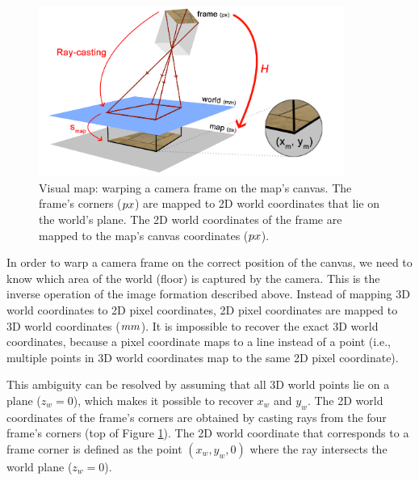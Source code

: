 \begin{figure}[htb]
\centering
\includegraphics[width=10cm]{images/mapping1.png}
\caption{Visual map: warping a camera frame on the map's canvas. The frame's corners ($\small{px}$) are mapped to 2D world coordinates that lie on the world's plane. The 2D world coordinates of the frame are mapped to the map's canvas coordinates ($\small{px}$).}
\label{fig:mapping2}
\end{figure}

In order to warp a camera frame on the correct position of the canvas, we need to know which area of the world (floor) is captured by the camera.
This is the inverse operation of the image formation described above.
Instead of mapping 3D world coordinates to 2D pixel coordinates, 2D pixel coordinates are mapped to 3D world coordinates ($\small{mm}$).
It is impossible to recover the exact 3D world coordinates, because a pixel coordinate maps to a line instead of a point (i.e., multiple points in 3D world coordinates map to the same 2D pixel coordinate).

This ambiguity can be resolved by assuming that all 3D world points lie on a plane ($z_w = 0$), which makes it possible to recover $x_w$ and $y_w$.
The 2D world coordinates of the frame's corners are obtained by casting rays from the four frame's corners (top of Figure \ref{fig:mapping2}).
The 2D world coordinate that corresponds to a frame corner is defined as the point $(x_w,  y_w , 0)$ where the ray intersects the world plane ($z_w = 0$).

